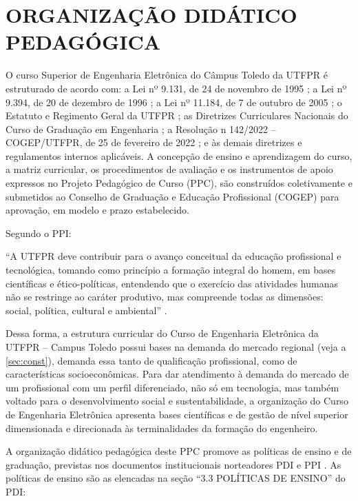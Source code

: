 \chapter{ORGANIZAÇÃO DIDÁTICO PEDAGÓGICA}
\label{chap:matriz}

O curso Superior de Engenharia Eletrônica do Câmpus Toledo da UTFPR  é estruturado de acordo com: a Lei nº 9.131, de 24 de novembro de 1995 \cite{Lei:9131:1995}; a Lei nº 9.394, de 20 de dezembro de 1996 \cite{Lei:9394:1996}; a Lei nº 11.184, de 7 de outubro de 2005 \cite{Lei:11.184:2005}; o Estatuto e Regimento Geral da UTFPR \cite{estatutoutfpr}; as Diretrizes Curriculares Nacionais do Curso de Graduação em Engenharia \cite{dcneng}; a Resolução n\textordmasculine{} 142/2022 – COGEP/UTFPR, de 25 de fevereiro de 2022 \cite{cogep142}; e às demais diretrizes e regulamentos internos aplicáveis. A concepção de ensino e aprendizagem do curso, a matriz curricular, os procedimentos de avaliação e os instrumentos de apoio expressos no Projeto Pedagógico de Curso (PPC), são construídos coletivamente e submetidos ao Conselho de Graduação e Educação Profissional (COGEP) para aprovação, em modelo e prazo estabelecido.

Segundo o PPI:

\begin{citacao}
	``A  UTFPR  deve  contribuir  para  o  avanço  conceitual  da educação profissional e tecnológica, tomando como princípio a formação integral do homem,  em  bases  científicas  e  ético-políticas,  entendendo  que  o  exercício  das atividades humanas não se restringe ao caráter produtivo, mas compreende todas as dimensões: social, política, cultural e ambiental'' \cite{ppiutfpr}.
\end{citacao}

Dessa forma, a estrutura curricular do Curso de Engenharia Eletrônica da UTFPR – Campus Toledo possui bases na demanda do mercado regional (veja a \autoref{sec:const}), demanda essa tanto de qualificação profissional, como de características socioeconômicas. Para dar atendimento à demanda do mercado de um profissional com um perfil diferenciado, não só em tecnologia, mas também voltado para o desenvolvimento social e sustentabilidade, a organização do Curso de Engenharia Eletrônica apresenta bases científicas e de gestão de nível superior dimensionada e direcionada às terminalidades da formação do engenheiro.

A organização didático pedagógica deste PPC promove as políticas de ensino e de graduação, previstas nos documentos institucionais norteadores PDI \cite{pdiutfpr} e PPI \cite{ppiutfpr}. As políticas de ensino são as elencadas na seção ``3.3 POLÍTICAS DE ENSINO'' do PDI:

